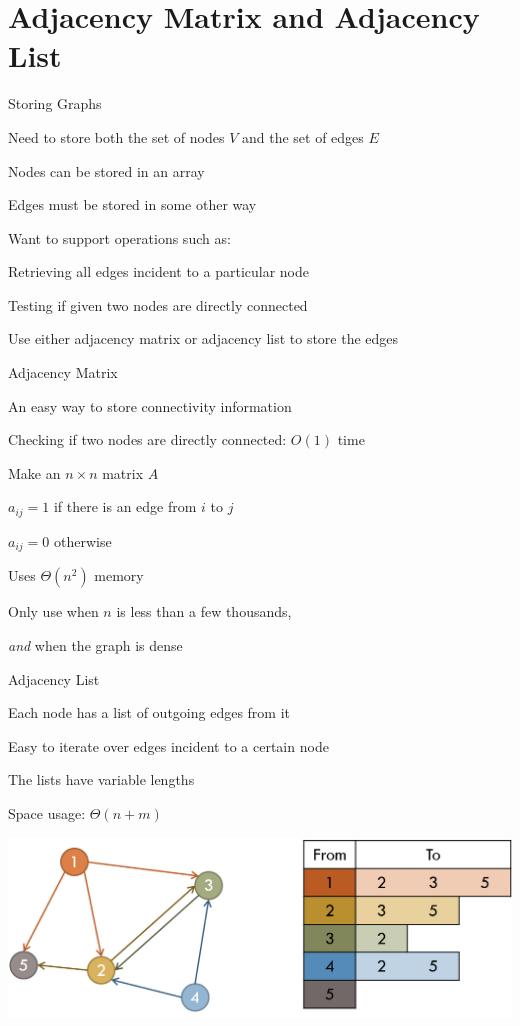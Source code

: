 \documentclass[13pt,onlymath]{beamer}
\begin{document}
\section{Adjacency Matrix and Adjacency List}

\begin{frame}{Storing Graphs}
\BIT
\item Need to store both the set of nodes $V$ and the set of edges $E$
\BIT
\item Nodes can be stored in an array
\item Edges must be stored in some other way
\EIT
\item Want to support operations such as:
\BIT
\item Retrieving all edges incident to a particular node
\item Testing if given two nodes are directly connected
\EIT
\item Use either adjacency matrix or adjacency list to store the edges
\EIT
\end{frame}

\begin{frame}{Adjacency Matrix}
\BIT
\item An easy way to store connectivity information
\BIT
\item Checking if two nodes are directly connected: $O(1)$ time
\EIT
\item Make an $n \times n$ matrix $A$
\BIT
\item $a_{ij} = 1$ if there is an edge from $i$ to $j$
\item $a_{ij} = 0$ otherwise
\EIT
\item Uses $\Theta(n^2)$ memory
\BIT
\item Only use when $n$ is less than a few thousands,
\item \emph{and} when the graph is dense
\EIT
\EIT
\end{frame}

\begin{frame}{Adjacency List}
\BIT
\item Each node has a list of outgoing edges from it
\BIT
\item Easy to iterate over edges incident to a certain node
\item The lists have variable lengths
\item Space usage: $\Theta(n+m)$
\EIT
\EIT
\vfill
\begin{center}
\includegraphics[height=0.4\textheight]{figures/adjlist1}
\end{center}
\end{frame}
\end{document}
